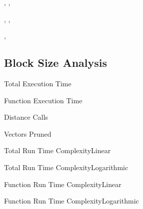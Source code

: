 \begin{frame}{, , }
\end{frame}

\begin{frame}{, , }
\end{frame}

\begin{frame}{, }
\end{frame}

\subsection{Block Size Analysis}
\begin{frame}{Total Execution Time}
\end{frame}

\begin{frame}{Function Execution Time}
\end{frame}

\begin{frame}{Distance Calls}
\end{frame}

\begin{frame}{Vectors Pruned}
\end{frame}

\begin{frame}{Total Run Time Complexity}{Linear}
\end{frame}

\begin{frame}{Total Run Time Complexity}{Logarithmic}
\end{frame}

\begin{frame}{Function Run Time Complexity}{Linear}
\end{frame}

\begin{frame}{Function Run Time Complexity}{Logarithmic}
\end{frame}
